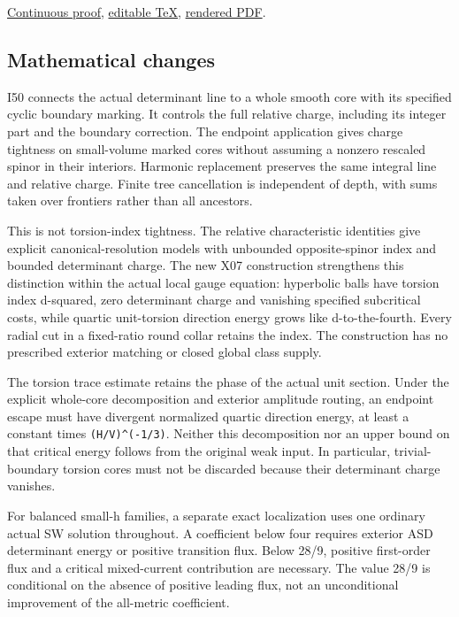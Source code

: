\documentclass[
  10pt,
]{article}
\begin{document}
\href{../continuation/20260927_marked_charge_and_first_order_flux.md}{Continuous
proof},
\href{../continuation/20260927_marked_charge_and_first_order_flux.tex}{editable
TeX},
\href{../continuation/20260927_marked_charge_and_first_order_flux.pdf}{rendered
PDF}.

\hypertarget{mathematical-changes}{%
\subsection{Mathematical changes}\label{mathematical-changes}}

I50 connects the actual determinant line to a whole smooth core with its
specified cyclic boundary marking. It controls the full relative charge,
including its integer part and the boundary correction. The endpoint
application gives charge tightness on small-volume marked cores without
assuming a nonzero rescaled spinor in their interiors. Harmonic
replacement preserves the same integral line and relative charge. Finite
tree cancellation is independent of depth, with sums taken over
frontiers rather than all ancestors.

This is not torsion-index tightness. The relative characteristic
identities give explicit canonical-resolution models with unbounded
opposite-spinor index and bounded determinant charge. The new X07
construction strengthens this distinction within the actual local gauge
equation: hyperbolic balls have torsion index d-squared, zero
determinant charge and vanishing specified subcritical costs, while
quartic unit-torsion direction energy grows like d-to-the-fourth. Every
radial cut in a fixed-ratio round collar retains the index. The
construction has no prescribed exterior matching or closed global class
supply.

The torsion trace estimate retains the phase of the actual unit section.
Under the explicit whole-core decomposition and exterior amplitude
routing, an endpoint escape must have divergent normalized quartic
direction energy, at least a constant times \texttt{(H/V)\^{}(-1/3)}.
Neither this decomposition nor an upper bound on that critical energy
follows from the original weak input. In particular, trivial-boundary
torsion cores must not be discarded because their determinant charge
vanishes.

For balanced small-h families, a separate exact localization uses one
ordinary actual SW solution throughout. A coefficient below four
requires exterior ASD determinant energy or positive transition flux.
Below 28/9, positive first-order flux and a critical mixed-current
contribution are necessary. The value 28/9 is conditional on the absence
of positive leading flux, not an unconditional improvement of the
all-metric coefficient.
\end{document}
